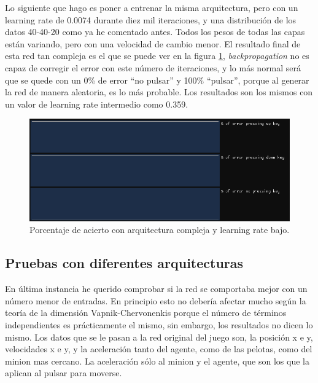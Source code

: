 Lo siguiente que hago es poner a entrenar la misma arquitectura, pero con un learning rate de 0.0074 durante diez mil iteraciones, y una distribución de los datos 40-40-20 como ya he comentado antes. Todos los pesos  de todas las capas están variando, pero con una velocidad de cambio menor. El resultado final de esta red tan compleja es el que se puede ver en la figura \ref{bajo learning rate arquitectura compleja}, \textit{backpropagation} no es capaz de corregir el error con este número de iteraciones, y lo más normal será que se quede con un 0\% de error ``no pulsar'' y 100\% ``pulsar'', porque al generar la red de manera aleatoria, es lo más probable. Los resultados son los mismos con un valor de learning rate intermedio como 0.359.
\begin{figure}[H]
	\centering
	\includegraphics[width=15cm]{archivos/imagenes/arquitectura-compleja-learning-rate-bajo.png}
	\caption{Porcentaje de acierto con arquitectura compleja y learning rate bajo.}
	\label{bajo learning rate arquitectura compleja}
\end{figure}

\subsection{Pruebas con diferentes arquitecturas}
En última instancia he querido comprobar si la red se comportaba mejor con un número menor de entradas. En principio esto no debería afectar mucho según la teoría de la dimensión Vapnik-Chervonenkis porque el número de términos independientes es prácticamente el mismo, sin embargo, los resultados no dicen lo mismo. Los datos que se le pasan a la red original del juego son, la posición x e y, velocidades x e y, y la aceleración tanto del agente, como de las pelotas, como del minion mas cercano. La aceleración sólo al minion y el agente, que son los que la aplican al pulsar para moverse.

